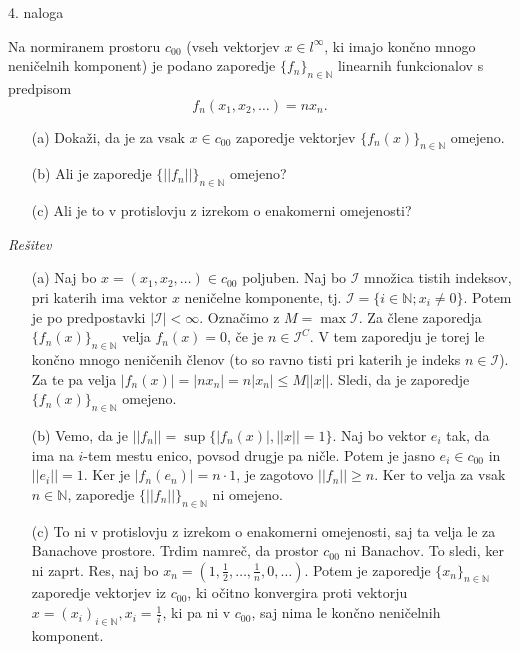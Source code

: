 \documentclass[a4paper, 12pt]{article}
\newcommand{\N}{\mathbb{N}}
\begin{document}
\begin{flushleft}
4. naloga
\end{flushleft}
Na normiranem prostoru $c_{00}$ (vseh vektorjev $x\in l^{\infty}$, ki imajo končno mnogo neničelnih komponent) je podano zaporedje $\{f_n\}_{n\in \N}$ linearnih funkcionalov s predpisom
$$
f_n(x_1,x_2,\dots) = n x_n.
$$
\begin{enumerate}
\item[(a)] Dokaži, da je za vsak $x\in c_{00}$ zaporedje vektorjev $\{ f_n(x) \}_{n\in \N}$ omejeno.
\item[(b)] Ali je zaporedje $\{ || f_n || \}_{n\in \N}$ omejeno?
\item[(c)] Ali je to v protislovju z izrekom o enakomerni omejenosti?
\end{enumerate}
\emph{Rešitev}
\begin{enumerate}
\item[(a)] Naj bo $x=(x_1,x_2,\dots) \in c_{00}$ poljuben. Naj bo $\mathcal{I}$ množica tistih indeksov, pri katerih ima vektor $x$ neničelne komponente, tj. $\mathcal{I} = \{ i \in \N; x_i \neq 0\}$. Potem je po predpostavki $|\mathcal{I} | < \infty$. Označimo z $M = \max \mathcal{I}$. Za člene zaporedja $\{f_n(x)\}_{n\in \N}$ velja $f_n(x) = 0$, če je $n\in \mathcal{I}^C$. V tem zaporedju je torej le končno mnogo neničenih členov (to so ravno tisti pri katerih je indeks $n\in \mathcal{I}$). Za te pa velja $|f_n(x)| = |nx_n| =n |x_n| \le M ||x||$. Sledi, da je zaporedje $\{f_n(x)\}_{n\in \N}$ omejeno.

\item[(b)] Vemo, da je $||f_n|| = \sup\{|f_n(x)|, ||x||=1\}$. Naj bo vektor $e_i$ tak, da ima na $i$-tem mestu enico, povsod drugje pa ničle. Potem je jasno $e_i\in c_{00}$ in $||e_i||=1$. Ker je $|f_n(e_n)| = n\cdot 1$, je zagotovo $||f_n|| \ge n$. Ker to velja za vsak $n\in \N$, zaporedje $\{||f_n||\}_{n\in \N}$ ni omejeno.

\item[(c)] To ni v protislovju z izrekom o enakomerni omejenosti, saj ta velja le za Banachove prostore. Trdim namreč, da prostor $c_{00}$ ni Banachov. To sledi, ker ni zaprt. Res, naj bo $x_{n} = (1,\frac{1}{2},\dots,\frac{1}{n},0,\dots)$. Potem je zaporedje $\{x_n\}_{n\in\N}$ zaporedje vektorjev iz $c_{00}$, ki očitno konvergira proti vektorju $x=(x_i)_{i\in \N}, x_i = \frac{1}{i}$, ki pa ni v $c_{00}$, saj nima le končno neničelnih komponent. 
\end{enumerate}
\end{document}
